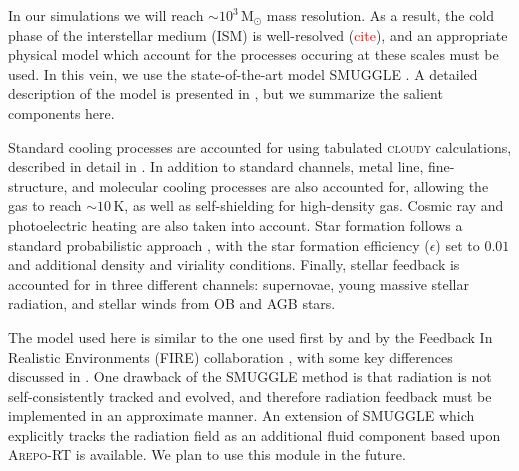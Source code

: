\documentclass[a4paper,fleqn,usenatbib]{mnras}
\newcommand{\Msun}{\ensuremath{\text{M}_{\odot}}}
\newcommand{\areport}{\textsc{Arepo-RT}}
\newcommand{\smuggle}{\textsc{SMUGGLE}}
\begin{document}
In our simulations we will reach $\sim10^3\,\Msun$ mass resolution. As a
result, the cold phase of the interstellar medium (ISM) is well-resolved
(\textcolor{red}{cite}), and an appropriate physical model which account for
the processes occuring at these scales must be used. In this vein, we use the
state-of-the-art model \smuggle{} \citep{2019MNRAS.489.4233M}. A detailed
description of the model is presented in \citet{2019MNRAS.489.4233M}, but we
summarize the salient components here.

Standard cooling processes are accounted for using tabulated \textsc{cloudy}
calculations, described in detail in \citet{2013MNRAS.436.3031V}. In addition
to standard channels, metal line, fine-structure, and molecular cooling
processes are also accounted for, allowing the gas to reach
$\sim10\,\text{K}$, as well as self-shielding for high-density gas. Cosmic ray
and photoelectric heating are also taken into account. Star formation follows
a standard probabilistic approach \citep{2003MNRAS.339..289S}, with the star
formation efficiency ($\epsilon$) set to $0.01$ and additional density and
viriality conditions. Finally, stellar feedback is accounted for in three
different channels: supernovae, young massive stellar radiation, and stellar
winds from OB and AGB stars.

The model used here is similar to the one used first by
\citet{2011MNRAS.410.1391A, 2013ApJ...770...25A} and by the Feedback In
Realistic Environments (FIRE) collaboration \citep{2011MNRAS.417..950H,
2014MNRAS.445..581H, 2018MNRAS.480..800H}, with some key differences discussed
in \citet{2019MNRAS.489.4233M}. One drawback of the \smuggle{} method is that
radiation is not self-consistently tracked and evolved, and therefore
radiation feedback must be implemented in an approximate manner. An extension
of \smuggle{} which explicitly tracks the radiation field as an additional
fluid component \citep{2019arXiv191014041K} based upon \areport{}
\citep{2019MNRAS.485..117K} is available. We plan to use this module in the
future.

\end{document}
